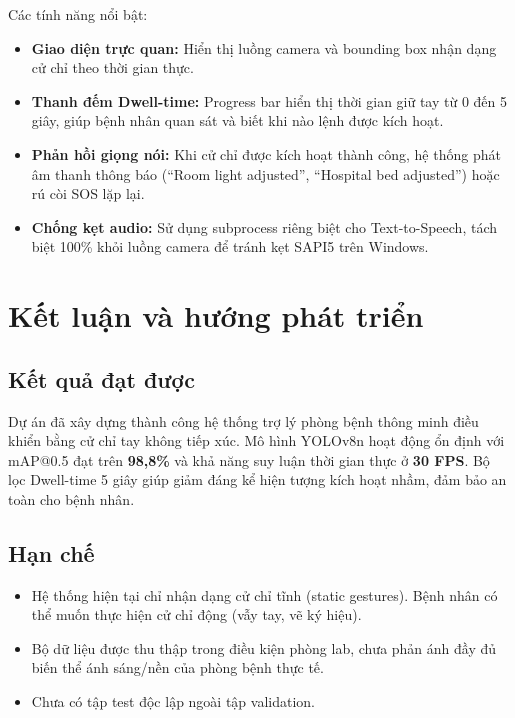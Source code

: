 \documentclass[conference]{IEEEtran}
\begin{document}
Các tính năng nổi bật:

\begin{itemize}
    \item \textbf{Giao diện trực quan:} Hiển thị luồng camera và bounding box nhận dạng cử chỉ theo thời gian thực.
    \item \textbf{Thanh đếm Dwell-time:} Progress bar hiển thị thời gian giữ tay từ 0 đến 5 giây, giúp bệnh nhân quan sát và biết khi nào lệnh được kích hoạt.
    \item \textbf{Phản hồi giọng nói:} Khi cử chỉ được kích hoạt thành công, hệ thống phát âm thanh thông báo (``Room light adjusted'', ``Hospital bed adjusted'') hoặc rú còi SOS lặp lại.
    \item \textbf{Chống kẹt audio:} Sử dụng subprocess riêng biệt cho Text-to-Speech, tách biệt 100\% khỏi luồng camera để tránh kẹt SAPI5 trên Windows.
\end{itemize}

\section{Kết luận và hướng phát triển}

\subsection{Kết quả đạt được}

Dự án đã xây dựng thành công hệ thống trợ lý phòng bệnh thông minh điều khiển bằng cử chỉ tay không tiếp xúc. Mô hình YOLOv8n hoạt động ổn định với mAP@0.5 đạt trên \textbf{98,8\%} và khả năng suy luận thời gian thực ở \textbf{30 FPS}. Bộ lọc Dwell-time 5 giây giúp giảm đáng kể hiện tượng kích hoạt nhầm, đảm bảo an toàn cho bệnh nhân.

\subsection{Hạn chế}

\begin{itemize}
    \item Hệ thống hiện tại chỉ nhận dạng cử chỉ tĩnh (static gestures). Bệnh nhân có thể muốn thực hiện cử chỉ động (vẫy tay, vẽ ký hiệu).
    \item Bộ dữ liệu được thu thập trong điều kiện phòng lab, chưa phản ánh đầy đủ biến thể ánh sáng/nền của phòng bệnh thực tế.
    \item Chưa có tập test độc lập ngoài tập validation.
\end{itemize}
\end{document}
